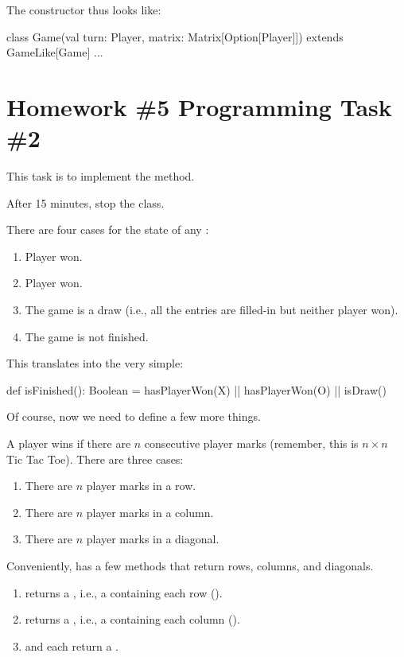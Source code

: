 \documentclass[9pt]{extbook}
\begin{document}
The  constructor thus looks like:

\begin{scalacode}
  class Game(val turn: Player, matrix: Matrix[Option[Player]]) extends GameLike[Game] { ... }
\end{scalacode}

\section{Homework \#5 Programming Task \#2}

This task is to implement the  method.

After 15 minutes, stop the class.

There are four cases for the state of any :

\begin{enumerate}
  \item Player  won.
  \item Player  won.
  \item The game is a draw (i.e., all the entries are filled-in but neither player won).
  \item The game is not finished.
\end{enumerate}

This translates into the very simple:

\begin{scalacode}
  def isFinished(): Boolean = {
    hasPlayerWon(X) || hasPlayerWon(O) || isDraw()
  }
\end{scalacode}

Of course, now we need to define a few more things.

A player wins if there are $n$ consecutive player marks (remember, this is $n \times n$ Tic Tac Toe).  There are three cases:

\begin{enumerate}
  \item There are $n$ player marks in a row.
  \item There are $n$ player marks in a column.
  \item There are $n$ player marks in a diagonal.
\end{enumerate}

Conveniently,  has a few methods that return rows, columns, and diagonals.

\begin{enumerate}
  \item {} returns a , i.e., a  containing each row ().
  \item {} returns a , i.e., a  containing each column ().
  \item {} and  each return a .
\end{enumerate}
\end{document}
